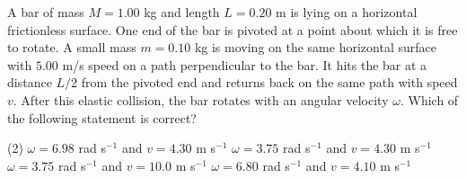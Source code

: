 \item A bar of mass \( M = 1.00 \) kg and length \( L = 0.20 \) m is lying on a horizontal frictionless surface. One end of the bar is pivoted at a point about which it is free to rotate. A small mass \( m = 0.10 \) kg is moving on the same horizontal surface with \( 5.00 \) m/s speed on a path perpendicular to the bar. It hits the bar at a distance \( L/2 \) from the pivoted end and returns back on the same path with speed \( v \). After this elastic collision, the bar rotates with an angular velocity \( \omega \). Which of the following statement is correct?
        \begin{tasks}(2)
            \task \( \omega = 6.98 \) rad s\(^{-1}\) and \( v = 4.30 \) m s\(^{-1}\)\ans
            \task \( \omega = 3.75 \) rad s\(^{-1}\) and \( v = 4.30 \) m s\(^{-1}\)
            \task \( \omega = 3.75 \) rad s\(^{-1}\) and \( v = 10.0 \) m s\(^{-1}\)
            \task \( \omega = 6.80 \) rad s\(^{-1}\) and \( v = 4.10 \) m s\(^{-1}\)
        \end{tasks}